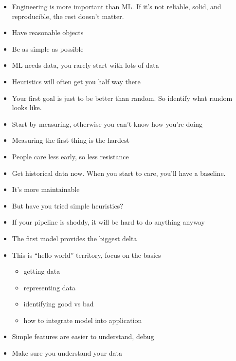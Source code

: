 
\begin{itemize}
\item Engineering is more important than ML.  If it's not reliable,
  solid, and reproducible, the rest doesn't matter.
\item Have reasonable objects
\item Be as simple as possible
\end{itemize}



\begin{itemize}
\item ML needs data, you rarely start with lots of data
\item Heuristics will often get you half way there
\item Your first goal is just to be better than random.  So identify
  what random looks like.
\end{itemize}


\begin{itemize}
\item Start by measuring, otherwise you can't know how you're doing
\item Measuring the first thing is the hardest
\item People care less early, so less resistance
\item Get historical data now.  When you start to care, you'll have a baseline.
\end{itemize}


\begin{itemize}
\item It's more maintainable
\item But have you tried simple heuristics?
\end{itemize}


\begin{itemize}
\item If your pipeline is shoddy, it will be hard to do anything
  anyway
\item The first model provides the biggest delta
\item This is ``hello world'' territory, focus on the basics
  \begin{itemize}
  \item getting data
  \item representing data
  \item identifying good vs bad
  \item how to integrate model into application
  \end{itemize}
\item Simple features are easier to understand, debug
\item Make sure you understand your data
\end{itemize}

